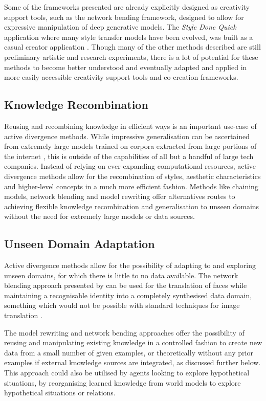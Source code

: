 Some of the frameworks presented are already explicitly designed as creativity support tools, such as the network bending framework, designed to allow for expressive manipulation of deep generative models. 
The \textit{Style Done Quick} \citep{colton2021evolving} application where many style transfer models have been evolved, was built as a casual creator application \citep{compton2015casual}. 
Though many of the other methods described are still preliminary artistic and research experiments, there is a lot of potential for these methods to become better understood and eventually adapted and applied in more easily accessible creativity support tools and co-creation frameworks. 

\subsection{Knowledge Recombination}

Reusing and recombining knowledge in efficient ways is an important use-case of active divergence methods. While impressive generalisation can be ascertained from extremely large models trained on corpora extracted from large portions of the internet \citep{ramesh2021zero}, this is outside of the capabilities of all but a handful of large tech companies. 
Instead of relying on ever-expanding computational resources, active divergence methods allow for the recombination of styles, aesthetic characteristics and higher-level concepts in a much more efficient fashion. 
Methods like chaining models, network blending and model rewriting offer alternatives routes to achieving flexible knowledge recombination and generalisation to unseen domains without the need for extremely large models or data sources. 

\subsection{Unseen Domain Adaptation}

Active divergence methods allow for the possibility of adapting to and exploring unseen domains, for which there is little to no data available. 
The network blending approach presented by \citet{pinkney2020interpolation} can be used for the translation of faces while maintaining a recognisable identity into a completely synthesised data domain, something which would not be possible with standard techniques for image translation \citep{zhu2017unpaired}.

The model rewriting and network bending approaches offer the possibility of reusing and manipulating existing knowledge in a controlled fashion to create new data from a small number of given examples, or theoretically without any prior examples if external knowledge sources are integrated, as discussed further below. 
This approach could also be utilised by agents looking to explore hypothetical situations, by reorganising learned knowledge from world models \citep{ha2018worldmodels} to explore hypothetical situations or relations. 

